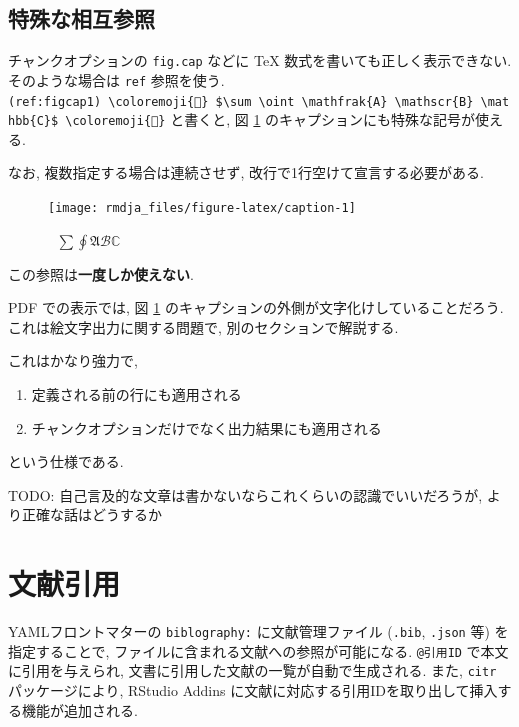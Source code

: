 \documentclass[
  xelatex,ja=standard,jafont=noto]{bxjsbook}
\providecommand{\tightlist}{%
  \setlength{\itemsep}{0pt}\setlength{\parskip}{0pt}}
\theoremstyle{definition}
\theoremstyle{definition}
\theoremstyle{definition}
\theoremstyle{definition}
\theoremstyle{remark}
\begin{document}
\hypertarget{ux7279ux6b8aux306aux76f8ux4e92ux53c2ux7167}{%
\subsection{特殊な相互参照}\label{ux7279ux6b8aux306aux76f8ux4e92ux53c2ux7167}}

チャンクオプションの \texttt{fig.cap} などに TeX
数式を書いても正しく表示できない. そのような場合は \texttt{ref}
参照を使う.
\texttt{(ref:figcap1)\ \textbackslash{}coloremoji\{🌸\}\ \$\textbackslash{}sum\ \textbackslash{}oint\ \textbackslash{}mathfrak\{A\}\ \textbackslash{}mathscr\{B\}\ \textbackslash{}mathbb\{C\}\$\ \textbackslash{}coloremoji\{🌸\}}
と書くと, 図 \ref{fig:caption} のキャプションにも特殊な記号が使える.




なお, 複数指定する場合は連続させず, 改行で1行空けて宣言する必要がある.

\begin{figure}

{\centering \texttt{[image: rmdja\_files/figure-latex/caption-1]} 

}

\caption{🌸
\(\sum \oint \mathfrak{A} \mathscr{B} \mathbb{C}\) 🌸}\label{fig:caption}
\end{figure}

この参照は\textbf{一度しか使えない}.

PDF での表示では, 図 \ref{fig:caption}
のキャプションの外側が文字化けしていることだろう.
これは絵文字出力に関する問題で, 別のセクションで解説する.

これはかなり強力で,

\begin{enumerate}
\def\labelenumi{\arabic{enumi}.}
\tightlist
\item
  定義される前の行にも適用される
\item
  チャンクオプションだけでなく出力結果にも適用される
\end{enumerate}

という仕様である.

TODO: 自己言及的な文章は書かないならこれくらいの認識でいいだろうが,
より正確な話はどうするか

\hypertarget{bibliography}{%
\section{文献引用}\label{bibliography}}

YAMLフロントマターの \texttt{biblography:} に文献管理ファイル
(\texttt{.bib}, \texttt{.json} 等) を指定することで,
ファイルに含まれる文献への参照が可能になる. \texttt{@引用ID}
で本文に引用を与えられ, 文書に引用した文献の一覧が自動で生成される.
また, \texttt{citr} パッケージにより, RStudio Addins
に文献に対応する引用IDを取り出して挿入する機能が追加される.
\end{document}
